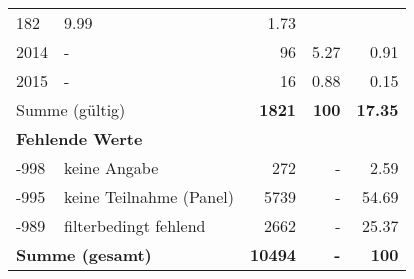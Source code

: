 \begin{longtable}{lXrrr}
       \num{182} &
       \num[round-mode=places,round-precision=2]{9,99} &
         \num[round-mode=places,round-precision=2]{1,73} \\

     2014 &
     \multicolumn{1}{X}{ -  } &


       \num{96} &
       \num[round-mode=places,round-precision=2]{5,27} &
         \num[round-mode=places,round-precision=2]{0,91} \\

     2015 &
     \multicolumn{1}{X}{ -  } &


       \num{16} &
       \num[round-mode=places,round-precision=2]{0,88} &
         \num[round-mode=places,round-precision=2]{0,15} \\
     \midrule
     \multicolumn{2}{l}{Summe (gültig)} &
       \textbf{\num{1821}} &
     \textbf{100} &
       \textbf{\num[round-mode=places,round-precision=2]{17,35}} \\
     \multicolumn{5}{l}{\textbf{Fehlende Werte}}\\
       -998 &
       keine Angabe &
         \num{272} &
        - &
         \num[round-mode=places,round-precision=2]{2,59} \\
       -995 &
       keine Teilnahme (Panel) &
         \num{5739} &
        - &
         \num[round-mode=places,round-precision=2]{54,69} \\
       -989 &
       filterbedingt fehlend &
         \num{2662} &
        - &
         \num[round-mode=places,round-precision=2]{25,37} \\
     \midrule
     \multicolumn{2}{l}{\textbf{Summe (gesamt)}} &
          \textbf{\num{10494}} &
        \textbf{-} &
        \textbf{100} \\
     \bottomrule
     \end{longtable}
     
